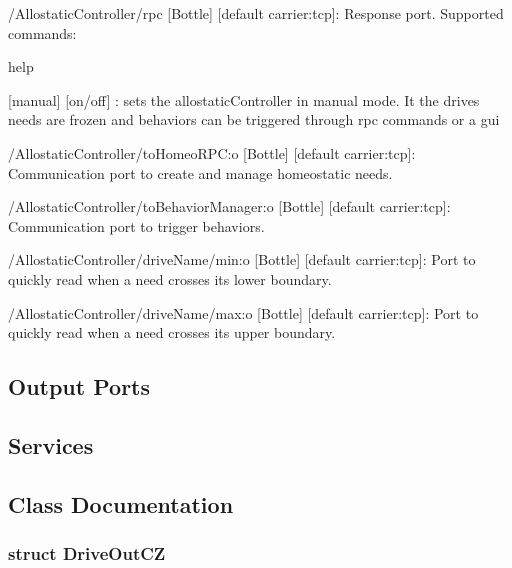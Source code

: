 \begin{DoxyItemize}
\item /\+Allostatic\+Controller/rpc \mbox{[}Bottle\mbox{]} \mbox{[}default carrier\+:tcp\mbox{]}\+: Response port. Supported commands\+:
\begin{DoxyItemize}
\item help
\item \mbox{[}\textquotesingle{}manual\textquotesingle{}\mbox{]} \mbox{[}\textquotesingle{}on\textquotesingle{}/\textquotesingle{}off\textquotesingle{}\mbox{]} \+: sets the allostatic\+Controller in manual mode. It the drives needs are frozen and behaviors can be triggered through rpc commands or a gui
\end{DoxyItemize}
\item /\+Allostatic\+Controller/to\+Homeo\+R\+PC\+:o \mbox{[}Bottle\mbox{]} \mbox{[}default carrier\+:tcp\mbox{]}\+: Communication port to create and manage homeostatic needs.
\item /\+Allostatic\+Controller/to\+Behavior\+Manager\+:o \mbox{[}Bottle\mbox{]} \mbox{[}default carrier\+:tcp\mbox{]}\+: Communication port to trigger behaviors.
\item /\+Allostatic\+Controller/drive\+Name/min\+:o \mbox{[}Bottle\mbox{]} \mbox{[}default carrier\+:tcp\mbox{]}\+: Port to quickly read when a need crosses its lower boundary.
\item /\+Allostatic\+Controller/drive\+Name/max\+:o \mbox{[}Bottle\mbox{]} \mbox{[}default carrier\+:tcp\mbox{]}\+: Port to quickly read when a need crosses its upper boundary.
\end{DoxyItemize}\hypertarget{group__touchDetector_outputports_sec}{}\subsection{Output Ports}\label{group__touchDetector_outputports_sec}
\hypertarget{group__touchDetector_services_sec}{}\subsection{Services}\label{group__touchDetector_services_sec}


\subsection{Class Documentation}
\label{structDriveOutCZ}
\subsubsection{struct Drive\+Out\+CZ}


